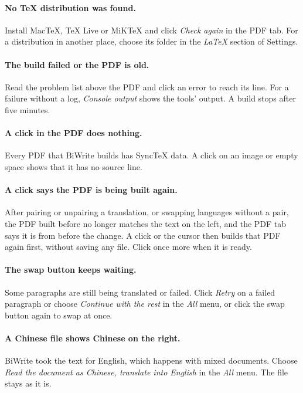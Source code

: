 \documentclass[a4paper,11pt]{article}
\newcommand{\ui}[1]{\emph{#1}}
\begin{document}
\paragraph{No TeX distribution was found.} Install MacTeX, TeX Live or MiKTeX and click \ui{Check again} in the PDF tab. For a distribution in another place, choose its folder in the \ui{LaTeX} section of Settings.

\paragraph{The build failed or the PDF is old.} Read the problem list above the PDF and click an error to reach its line. For a failure without a log, \ui{Console output} shows the tools' output. A build stops after five minutes.

\paragraph{A click in the PDF does nothing.} Every PDF that BiWrite builds has SyncTeX data. A click on an image or empty space shows that it has no source line.

\paragraph{A click says the PDF is being built again.} After pairing or unpairing a translation, or swapping languages without a pair, the PDF built before no longer matches the text on the left, and the PDF tab says it is from before the change. A click or the cursor then builds that PDF again first, without saving any file. Click once more when it is ready.

\paragraph{The swap button keeps waiting.} Some paragraphs are still being translated or failed. Click \ui{Retry} on a failed paragraph or choose \ui{Continue with the rest} in the \ui{All} menu, or click the swap button again to swap at once.

\paragraph{A Chinese file shows Chinese on the right.} BiWrite took the text for English, which happens with mixed documents. Choose \ui{Read the document as Chinese, translate into English} in the \ui{All} menu. The file stays as it is.
\end{document}

